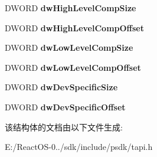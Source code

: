 \begin{DoxyCompactItemize}
\mbox{\label{structlinecallparams__tag_adf258cfe36a842ccf257b74d51d5264c}} 
D\+W\+O\+RD {\bfseries dw\+High\+Level\+Comp\+Size}
\item 
\mbox{\label{structlinecallparams__tag_a6d7bc87bc6090a5bae4b1321e1ae7cdc}} 
D\+W\+O\+RD {\bfseries dw\+High\+Level\+Comp\+Offset}
\item 
\mbox{\label{structlinecallparams__tag_a5db8d85d1ce1df0f832e206cc5b2664d}} 
D\+W\+O\+RD {\bfseries dw\+Low\+Level\+Comp\+Size}
\item 
\mbox{\label{structlinecallparams__tag_ab6d136fcd37e52dddae0434dd19c1d3d}} 
D\+W\+O\+RD {\bfseries dw\+Low\+Level\+Comp\+Offset}
\item 
\mbox{\label{structlinecallparams__tag_ac3a5952e048a7c4d569fb4d222251a1d}} 
D\+W\+O\+RD {\bfseries dw\+Dev\+Specific\+Size}
\item 
\mbox{\label{structlinecallparams__tag_aeab4098fe1104518709426bc19e927d7}} 
D\+W\+O\+RD {\bfseries dw\+Dev\+Specific\+Offset}
\end{DoxyCompactItemize}


该结构体的文档由以下文件生成\+:\begin{DoxyCompactItemize}
\item 
E\+:/\+React\+O\+S-\/0../sdk/include/psdk/tapi.\+h\end{DoxyCompactItemize}
